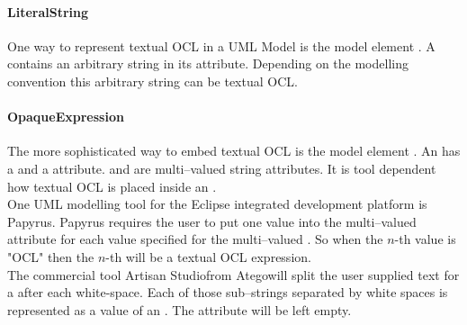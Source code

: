 \paragraph{LiteralString}
One way to represent textual OCL in a UML Model is the model element . A  contains an arbitrary string in its  attribute. Depending on the modelling convention this arbitrary string can be textual OCL.
\paragraph{OpaqueExpression}The more sophisticated way to embed textual OCL is the model element . An  has a  and a  attribute.  and  are multi--valued string attributes. It is tool dependent how textual OCL is placed inside an .\\One UML modelling tool for the Eclipse integrated development platform is Papyrus. Papyrus requires the user to put one value into the multi--valued  attribute for each value specified for the multi--valued . So when the $n$-th  value is "OCL" then the $n$-th  will be a textual OCL expression.\\
The commercial tool Artisan Studio\textregistered from Atego\texttrademark will split the user supplied text for a  after each white-space. Each of those sub--strings separated by white spaces is represented as a  value of an . The  attribute will be left empty.


